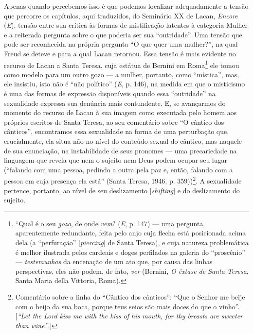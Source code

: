 Apenas quando percebemos isso é que podemos localizar adequadamente a
tensão que percorre os capítulos, aqui traduzidos, do Seminário XX de
Lacan, \emph{Encore} (\emph{E}), tensão entre sua crítica às formas de
mistificação latentes à categoria Mulher e a reiterada pergunta sobre o
que poderia ser sua ``outridade''. Uma tensão que pode ser reconhecida
na própria pergunta ``O que quer uma mulher?'', na qual Freud se deteve
e para a qual Lacan retornou. Essa tensão é mais evidente no recurso de
Lacan a Santa Teresa, cuja estátua de Bernini em Roma\footnote{``Qual é
  o seu \emph{gozo}, de onde \emph{vem}? (\emph{E}, p. 147) --- uma
  pergunta, aparentemente redundante, feita pelo anjo cuja flecha está
  posicionada acima dela (a ``perfuração'' {[}\emph{piercing}{]} de
  Santa Teresa), e cuja natureza problemática é melhor ilustrada pelos
  cardeais e doges perfilados na galeria do ``proscênio'' ---
  \emph{testemunhas} da encenação de um ato que, por causa das linhas
  perspectivas, eles não podem, de fato, \emph{ver} (Bernini, \emph{O
  êxtase de Santa Teresa}, Santa Maria della Vittoria, Roma).} ele tomou
como modelo para um outro gozo --- a mulher, portanto, como ``mística'',
mas, ele insistiu, isto não é ``não político'' (\emph{E}, p. 146), na
medida em que o misticismo é uma das formas de expressão disponíveis
quando essa ``outridade'' na sexualidade expressa sua denúncia mais
contundente. E, se avançarmos do momento do recurso de Lacan à sua
imagem como executada pelo homem aos próprios escritos de Santa Teresa,
ao seu comentário sobre ``O cântico dos cânticos'', encontramos essa
sexualidade na forma de uma perturbação que, crucialmente, ela situa não
no nível do conteúdo sexual do cântico, mas naquele de sua enunciação,
na instabilidade de seus pronomes --- uma precariedade na linguagem que
revela que nem o sujeito nem Deus podem ocupar seu lugar (``falando com
uma pessoa, pedindo a outra pela paz e, então, falando com a pessoa em
cuja presença ela está'' (Santa Teresa, 1946, p. 359))\footnote{Comentário
  sobre a linha do ``Cântico dos cânticos'': ``Que o Senhor me beije com
  o beijo da sua boca, porque teus seios são mais doces do que o
  vinho''. {[}\emph{``Let the Lord kiss me with the kiss of his mouth,
  for thy breasts are sweeter than wine''}.{]}}. A sexualidade pertence,
portanto, ao nível de seu deslizamento {[}\emph{shifting}{]} e do
deslizamento do sujeito.

